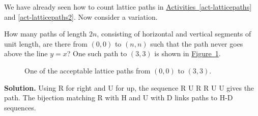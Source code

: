 \documentclass{book}
\begin{document}
\setcounter{project}{172}
\addtocounter{project}{-1}
\begin{activity}[]\label{act-lowerpaths}
\hypertarget{p-1030}{}%
We have already seen how to count lattice paths in \hyperref[act-latticepaths]{Activities~\ref{act-latticepaths}} and \hyperref[act-latticepaths2]{\ref{act-latticepaths2}}.  Now consider a variation.%
\par
\hypertarget{p-1031}{}%
How many paths of length \(2n\), consisting of horizontal and vertical segments of unit length, are there from \((0, 0)\) to \((n, n)\) such that the path never goes above the line \(y = x\)? One such path to \((3, 3)\) is shown in \hyperref[catalanpathex]{Figure~\ref{catalanpathex}}.%
\begin{figure}
\centering
{
}
\caption{One of the acceptable lattice paths from \((0,0)\) to \((3,3)\).\label{catalanpathex}}
\end{figure}
\par\smallskip%
\noindent\textbf{Solution.}\hypertarget{solution-102}{}\quad%
\hypertarget{p-1032}{}%
Using R for right and U for up, the sequence R U R R U U gives the path. The bijection matching R with H and U with D links paths to H-D sequences.%
\end{activity}
\end{document}
